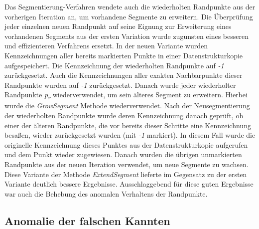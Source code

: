 Das Segmentierung-Verfahren wendete auch die wiederholten Randpunkte aus der vorherigen Iteration an, um vorhandene Segmente zu erweitern. Die Überprüfung jeder einzelnen neuen Randpunkt auf seine Eignung zur Erweiterung eines vorhandenen Segments aus der ersten Variation wurde zugunsten eines besseren und effizienteren Verfahrens ersetzt. In der neuen Variante wurden Kennzeichnungen aller bereits markierten Punkte in einer Datenstrukturkopie aufgespeichert. Die Kennzeichnung der wiederholten Randpunkte auf \textit{-1} zurückgesetzt. Auch die Kennzeichnungen aller exakten Nachbarpunkte dieser Randpunkte wurden auf \textit{-1} zurückgesetzt. Danach wurde jeder wiederholter Randpunkte \textit{p\textsubscript{r}} wiederverwendet, um sein älteres Segment zu erweitern. Hierbei wurde die \textit{GrowSegment} Methode wiederverwendet. Nach der Neusegmentierung der wiederholten Randpunkte wurde deren Kennzeichnung danach geprüft, ob einer der älteren Randpunkte, die vor bereits dieser Schritte eine Kennzeichnung besaßen, wieder zurückgesetzt wurden (mit \textit{-1} markiert). In diesem Fall wurde die originelle Kennzeichnung dieses Punktes aus der Datenstrukturkopie aufgerufen und dem Punkt wieder zugewiesen. Danach wurden die übrigen unmarkierten Randpunkte aus der neuen Iteration verwendet, um neue Segmente zu wachsen. Diese Variante der Methode \textit{ExtendSegment} lieferte im Gegensatz zu der ersten Variante deutlich bessere Ergebnisse. Ausschlaggebend für diese guten Ergebnisse war auch die Behebung des anomalen Verhaltens der Randpunkte.

\subsection{Anomalie der falschen Kannten} \label{false_edges}

 